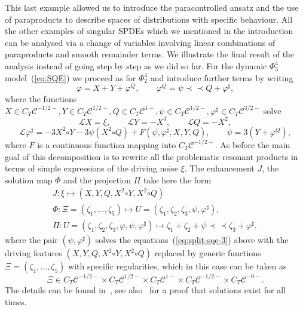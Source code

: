 \documentclass[a4paper, 11pt]{article}
\newcommand{\mpara}{\mathord{\prec\!\!\!\prec}}
\newcommand{\reso}{\mathord{\circ}}
\begin{document}
This last example allowed us to introduce the paracontrolled ansatz and the
use of paraproducts to describe spaces of distributions with specific
behaviour. All the other examples of singular SPDEs which we mentioned in the
introduction can be analysed via a change of variables involving linear
combinations of paraproducts and smooth remainder terms. We illustrate the
final result of the analysis instead of going step by step as we did so far.
For the dynamic $\Phi^4_3$ model~(\ref{eq:SQE}) we proceed as for $\Phi^4_2$
and introduce further terms by writing
\[ \varphi = X + Y + \varphi^Q, \qquad \varphi^Q = \psi \mpara Q +
   \varphi^{\sharp}, \]
where the functions $X \in C_T \mathcal{C}^{- 1 / 2 -}, Y \in C_T
\mathcal{C}^{1 / 2 -}, Q \in C_T \mathcal{C}^{1 -}, \psi \in C_T
\mathcal{C}^{1 / 2 -}, \varphi^{\sharp} \in C_T \mathcal{C}^{3 / 2 -}$ solve
\[
   \mathcal{L}X = \xi, \qquad \mathcal{L}Y = - X^3, \qquad \mathcal{L}Q = -X^2,
\]
\begin{equation}
  \mathcal{L} \varphi^{\sharp} = - 3 X^2 \reso Y - 3 \psi (X^2 \reso Q) + F
  (\psi, \varphi^{\sharp}, X, Y, Q), \qquad \psi = 3 (Y + \varphi^Q),
  \label{eq:split-sqe-3}
\end{equation}
where $F$ is a continuous function mapping into $C_T \mathcal{C}^{- 1 / 2 -}$.
As before the main goal of this decomposition is to rewrite all the
problematic resonant products in terms of simple expressions of the driving
noise $\xi$. The enhancement $J$, the solution map $\Phi$ and the projection
$\Pi$ take here the form
\begin{equation}
  \begin{array}{l}
    J : \xi \mapsto (X, Y, Q, X^2 \reso Y, X^2 \reso Q)\\
    \Phi : \Xi = (\zeta_1, \ldots, \zeta_5) \mapsto U = (\zeta_1, \zeta_2,
    \zeta_3, \psi, \varphi^{\sharp}),\\
    \Pi : U = (\zeta_1, \zeta_2, \zeta_3, \varphi, \psi, \varphi^{\sharp})
    \mapsto \zeta_1 + \zeta_2 + \psi \mpara \zeta_3 + \varphi^{\sharp},
  \end{array} \label{eq:SQE-sol}
\end{equation}
where the pair $(\psi, \varphi^{\sharp})$ solves the
equations~(\ref{eq:split-sqe-3}) above with the driving features $(X, Y, Q,
X^2 \reso Y, X^2 \reso Q)$ replaced by generic functions $\Xi = (\zeta_1,
\ldots, \zeta_5)$ with specific regularities, which in this case can be taken
as
\[ \Xi \in C_T \mathcal{C}^{- 1 / 2 -} \times C_T \mathcal{C}^{1 / 2 -} \times
   C_T \mathcal{C}^{1 -} \times C_T \mathcal{C}^{- 1 / 2 -} \times C_T
   \mathcal{C}^{- 0 -} . \]
   The details can be found in~\cite{catellier_paracontrolled_2013}, see also~\cite{mourrat_global_2016} for a proof that solutions exist for all times.
   
\end{document}
